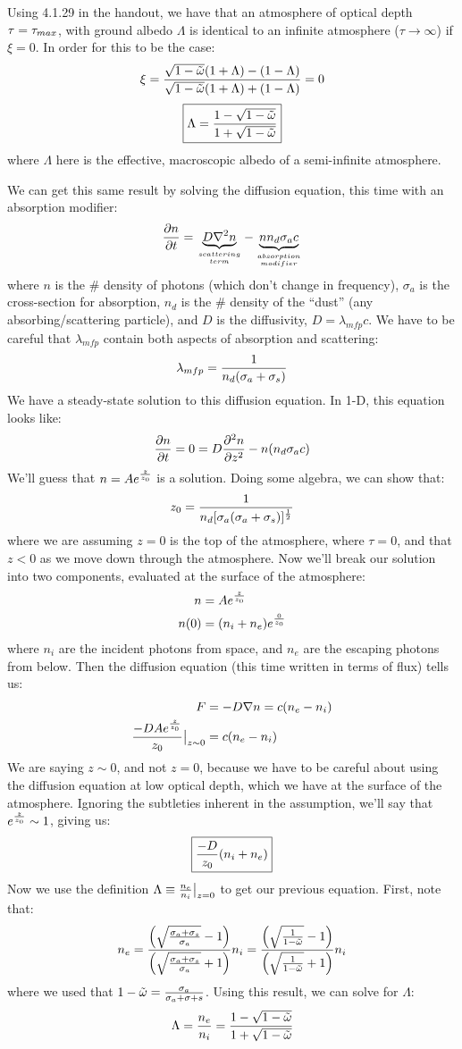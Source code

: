 \documentclass[11pt]{article}
\def\hf{{1 \over 2}}
\def\inv#1{{1 \over #1}}
\def\eval#1{\big|_{#1}}
\begin{document}
Using 4.1.29 in the handout, we have that an atmosphere of optical depth
$\tau={\tau_{max}}$, with ground albedo $\Lambda$ is identical to an infinite 
atmosphere ($\tau\to\infty$) if $\xi=0$.  In order for this to be the case:
$$\xi={\sqrt{1-{\tilde\omega}}(1+\Lambda)-(1-\Lambda)
\over\sqrt{1-{\tilde\omega}}(1+\Lambda)+(1-\Lambda)}=0$$
$$\boxed{\Lambda={1-\sqrt{1-{\tilde\omega}}\over1+\sqrt{1-{\tilde\omega}}}}$$
where $\Lambda$ here is the effective, macroscopic albedo of a semi-infinite
atmosphere.\par
We can get this same result by solving the diffusion equation, this time with
an absorption modifier:
$${\partial n\over\partial t}=\underbrace{D\nabla^2n}_{scattering\atop term}
-\underbrace{nn_d\sigma_ac}_{absorption\atop modifier}$$
where $n$ is the \# density of photons (which don't change in frequency), 
$\sigma_a$ is the cross-section for
absorption, $n_d$ is the \# density of the ``dust'' (any absorbing/scattering
particle), and $D$ is the diffusivity, $D=\lambda_{mfp}c$.  We have to be
careful that $\lambda_{mfp}$ contain both aspects of absorption and scattering:
$$\lambda_{mfp}=\inv{n_d(\sigma_a+\sigma_s)}$$
We have a steady-state solution to this diffusion equation.  In 1-D, this 
equation looks like:
$${\partial n\over\partial t}=0=D{\partial^2n\over\partial z^2}-n(n_d\sigma_ac)$$
We'll guess that $n=Ae^{z\over z_0}$ is a solution.  Doing some algebra, we
can show that:
$$z_0=\inv{n_d[\sigma_a(\sigma_a+\sigma_s)]^\hf}$$
where we are assuming $z=0$ is the top of the atmosphere, where $\tau=0$, and
that $z<0$ as we move down through the atmosphere.  Now we'll break our
solution into two components, evaluated at the surface of the atmosphere:
$$\begin{aligned}n&=Ae^{z\over z_0}\\ 
n(0)&=(n_i+n_e)e^{0\over z_0}\\ \end{aligned}$$
where $n_i$ are the incident photons from space, and $n_e$ are the escaping
photons from below.  Then the diffusion equation (this time written in terms
of flux) tells us:
$$\begin{aligned}F&=-D\nabla n=c(n_e-n_i)\\ 
{-DAe^{z\over z_0}\over z_0}\eval{z\sim0}&=c(n_e-n_i)\\ \end{aligned}$$
We are saying $z\sim0$, and not $z=0$, because we have to be careful about
using the diffusion equation at low optical depth, which we have at the surface
of the atmosphere.  Ignoring the subtleties inherent in the assumption, we'll
say that $e^{z\over z_0}\sim1$, giving us:
$$\boxed{{-D\over z_0}(n_i+n_e)}$$
Now we use the definition $\Lambda\equiv{n_e\over n_i}\eval{z=0}$ to get our
previous equation.  First, note that:
$$n_e={\left(\sqrt{\sigma_a+\sigma_s\over\sigma_a}-1\right)\over
\left(\sqrt{\sigma_a+\sigma_s\over\sigma_a}+1\right)}n_i
={\left(\sqrt{\inv{1-\wt}}-1\right)\over\left(\sqrt{\inv{1-\wt}}+1\right)}n_i$$
where we used that $1-{\tilde\omega}={\sigma_a\over\sigma_a+\sigma+s}$.  Using this
result, we can solve for $\Lambda$:
$$\Lambda={n_e\over n_i}={1-\sqrt{1-{\tilde\omega}}\over1+\sqrt{1-{\tilde\omega}}}$$
\end{document}
